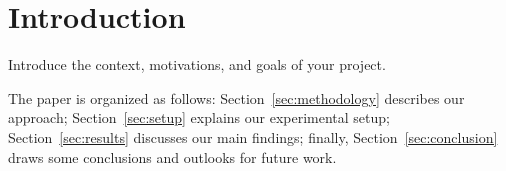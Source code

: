 \section{Introduction}
\label{sec:introduction}

Introduce the context, motivations, and goals of your project.

The paper is organized as follows: Section~\ref{sec:methodology} describes our approach; Section~\ref{sec:setup} explains our experimental setup; Section~\ref{sec:results} discusses our main findings; finally, Section~\ref{sec:conclusion} draws some conclusions and outlooks for future work.